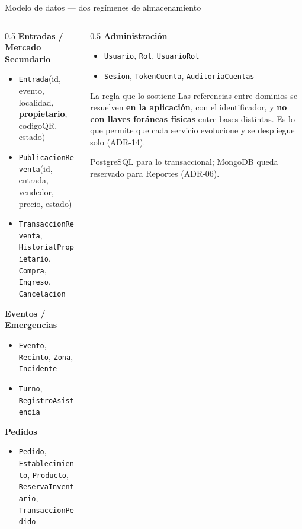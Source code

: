 \documentclass[aspectratio=169,10pt,xcolor={table}]{beamer}
\begin{document}
\begin{frame}{Modelo de datos --- dos regímenes de almacenamiento}
  \scriptsize
  \begin{columns}[T]
    \begin{column}{0.5\textwidth}
      \textbf{Entradas / Mercado Secundario}
      \begin{itemize}\scriptsize
        \item \texttt{Entrada}(id, evento, localidad, \textbf{propietario}, codigoQR, estado)
        \item \texttt{PublicacionReventa}(id, entrada, vendedor, precio, estado)
        \item \texttt{TransaccionReventa}, \texttt{HistorialPropietario}, \texttt{Compra},
              \texttt{Ingreso}, \texttt{Cancelacion}
      \end{itemize}
      \textbf{Eventos / Emergencias}
      \begin{itemize}\scriptsize
        \item \texttt{Evento}, \texttt{Recinto}, \texttt{Zona}, \texttt{Incidente}
        \item \texttt{Turno}, \texttt{RegistroAsistencia}
      \end{itemize}
      \textbf{Pedidos}
      \begin{itemize}\scriptsize
        \item \texttt{Pedido}, \texttt{Establecimiento}, \texttt{Producto},
              \texttt{ReservaInventario}, \texttt{TransaccionPedido}
      \end{itemize}
    \end{column}
    \begin{column}{0.5\textwidth}
      \textbf{Administración}
      \begin{itemize}\scriptsize
        \item \texttt{Usuario}, \texttt{Rol}, \texttt{UsuarioRol}
        \item \texttt{Sesion}, \texttt{TokenCuenta}, \texttt{AuditoriaCuentas}
      \end{itemize}
      \vspace{0.6em}
      \begin{alertblock}{La regla que lo sostiene}
        \scriptsize Las referencias entre dominios se resuelven \textbf{en la aplicación}, con el
        identificador, y \textbf{no con llaves foráneas físicas} entre bases distintas. Es lo que
        permite que cada servicio evolucione y se despliegue solo (ADR-14).
      \end{alertblock}
      \vspace{0.3em}
      \scriptsize PostgreSQL para lo transaccional; MongoDB queda reservado para Reportes
      (ADR-06).
    \end{column}
  \end{columns}
\end{frame}
\end{document}
